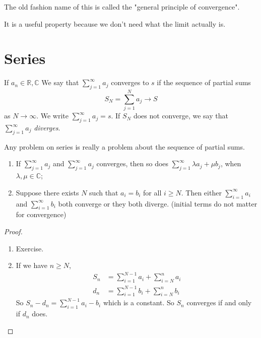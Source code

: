 The old fashion name of this is called the "general principle of convergence".

It is a useful property because we don't need what the limit actually is.
\section{Series}
\begin{definition}{}{}
    If \(a_n \in \mathbb{R},\mathbb{C}\) We say that \(\sum\limits_{j=1}^{\infty} a_j\) converges to \(s\) if the sequence of partial sums
    \[
        S_{N} = \sum\limits_{j=1}^{N} a_j \to S
    \]
    as \(N \to \infty\). We write \(\sum\limits_{j=1}^{\infty} a_j = s\). If \(S_N\) does not converge, we say that \(\sum\limits_{j=1}^{\infty} a_j\) \textit{diverges}.
\end{definition}
\begin{remark}
    Any problem on series is really a problem about the sequence of partial sums.
\end{remark}
\begin{lemma}{}{}
    \leavevmode
    \begin{enumerate}
        \item If \(\sum\limits_{j=1}^{\infty} a_j\) and \(\sum\limits_{j=1}^{\infty} a_j\) converges, then so does \(\sum\limits_{j=1}^{\infty} \lambda a_j + \mu b_j\), when \(\lambda,\mu \in \mathbb{C}\);
        \item Suppose there exists \(N\) such that \(a_i = b_i\) for all \(i \geq  N\). Then either \(\sum\limits_{i=1}^{\infty} a_i\) and \(\sum\limits_{i=1}^{\infty} b_i\) both converge or they both diverge. (initial terms do not matter for convergence)
    \end{enumerate}
\end{lemma}
\begin{proof}
    \begin{enumerate}
        \item Exercise.
        \item If we have \( n\geq N\),
        \begin{align*}
            S_n &=\sum\limits_{i=1}^{N-1} a_i + \sum\limits_{i=N}^{n} a_i\\
            d_n &=\sum\limits_{i=1}^{N-1} b_i + \sum\limits_{i=N}^{n} b_i
        \end{align*}
        So \(S_n - d_n = \sum\limits_{i=1}^{N-1} a_i - b_i\) which is a constant. So \(S_n\) converges if and only if \(d_n\) does.
    \end{enumerate}
\end{proof}